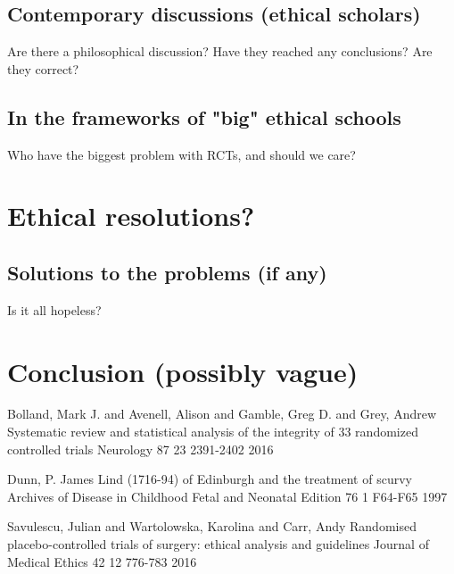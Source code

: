 \documentclass[12p]{article}
\begin{document}
\subsection*{Contemporary discussions (ethical scholars)}
Are there a philosophical discussion? Have they reached any conclusions? Are they correct?
\subsection*{In the frameworks of "big" ethical schools}
Who have the biggest problem with RCTs, and should we care?

\section*{Ethical resolutions?}
\subsection*{Solutions to the problems (if any)}
Is it all hopeless?
\section*{Conclusion (possibly vague)}

\begin{thebibliography}{9}

Bolland, Mark J. and Avenell, Alison and Gamble, Greg D. and Grey, Andrew
Systematic review and statistical analysis of the integrity of 33 randomized controlled trials
Neurology
87
23
2391-2402
2016

Dunn, P.
James Lind (1716-94) of Edinburgh and the treatment of scurvy
Archives of Disease in Childhood Fetal and Neonatal Edition
76
1
F64-F65
1997

Savulescu, Julian and Wartolowska, Karolina and Carr, Andy
Randomised placebo-controlled trials of surgery: ethical analysis and guidelines
Journal of Medical Ethics
42
12
776-783
2016

\end{thebibliography}
 
\end{document}

